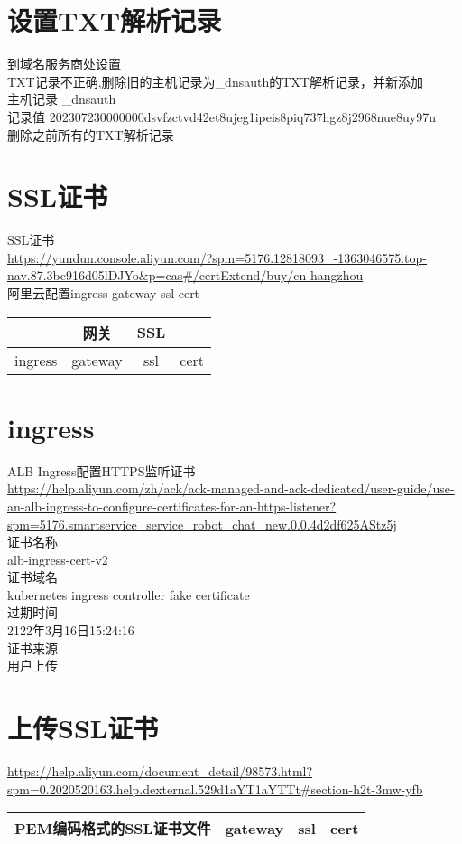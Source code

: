 \documentclass[12pt,twiside,a4paper]{ctexbook}
\numberwithin{chapter}{part}
\begin{document}
\section{设置TXT解析记录}
到域名服务商处设置\\
TXT记录不正确,删除旧的主机记录为\_dnsauth的TXT解析记录，并新添加\\
主机记录   \_dnsauth\\
记录值      202307230000000dsvfzctvd42et8ujeg1ipeis8piq737hgz8j2968nue8uy97n\\
删除之前所有的TXT解析记录

\section{SSL证书}
SSL证书\\
\url{https://yundun.console.aliyun.com/?spm=5176.12818093_-1363046575.top-nav.87.3be916d05lDJYo&p=cas#/certExtend/buy/cn-hangzhou}\\
阿里云配置ingress gateway ssl cert\\
\begin{tabular}{|c|c|c|c|}
\hline
 & 网关 & SSL & \\
\hline
ingress & gateway & ssl & cert\\
\hline
\end{tabular}

\section{ingress}
ALB Ingress配置HTTPS监听证书\\
\url{https://help.aliyun.com/zh/ack/ack-managed-and-ack-dedicated/user-guide/use-an-alb-ingress-to-configure-certificates-for-an-https-listener?spm=5176.smartservice_service_robot_chat_new.0.0.4d2df625AStz5j}\\
证书名称\\
alb-ingress-cert-v2 \\
证书域名\\
kubernetes ingress controller fake certificate\\
过期时间\\
2122年3月16日15:24:16\\
证书来源\\
用户上传

\section{上传SSL证书}
\url{https://help.aliyun.com/document_detail/98573.html?spm=0.2020520163.help.dexternal.529d1aYT1aYTTt#section-h2t-3mw-yfb}\\
\begin{tabular}{|c|c|c|c|}
\hline
PEM编码格式的SSL证书文件 & gateway & ssl & cert\\
\hline
\end{tabular}
\end{document}
